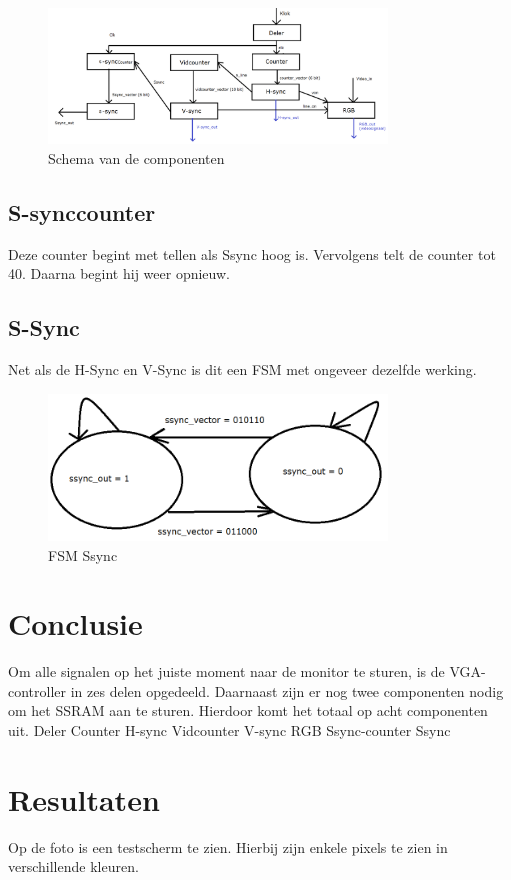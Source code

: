 \documentclass[oneside,dutch]{tudelft-report}
\begin{document}
\begin{figure}[H]
\center
\includegraphics[width=9cm]{schema-met-SRAM}
\caption{Schema van de componenten}
\label{VGA}
\end{figure}

\subsection{S-synccounter}
Deze counter begint met tellen als Ssync hoog is. Vervolgens telt de counter tot 40. Daarna begint hij weer opnieuw.

\subsection{S-Sync}
Net als de H-Sync en V-Sync is dit een FSM met ongeveer dezelfde werking. 

\begin{figure}[H]
\center
\includegraphics[width=9cm]{FSM-Ssync}
\caption{FSM Ssync}
\label{VGA}
\end{figure}

\section{Conclusie}
Om alle signalen op het juiste moment naar de monitor te sturen, is de VGA-controller in zes delen opgedeeld. Daarnaast zijn er nog twee componenten nodig om het SSRAM aan te sturen. Hierdoor komt het totaal op acht componenten uit. 
Deler
Counter
H-sync
Vidcounter
V-sync
RGB
Ssync-counter
Ssync

\section{Resultaten}
Op de foto is een testscherm te zien. Hierbij zijn enkele pixels te zien in verschillende kleuren.
\end{document}
